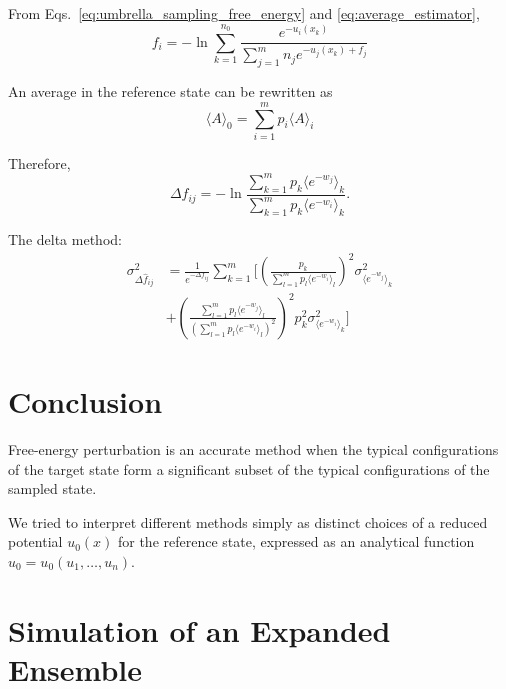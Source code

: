 \documentclass[aip,jcp,reprint,amsmath,amssymb]{revtex4-1}
\begin{document}
From Eqs.~\eqref{eq:umbrella_sampling_free_energy} and \eqref{eq:average_estimator},
\begin{equation*}
f_i = -\ln \sum_{k=1}^{n_0} \frac{e^{-u_i(x_k)}}{\sum_{j=1}^m n_j e^{-u_j(x_k) + f_j}}
\end{equation*}

An average in the reference state can be rewritten as
\begin{equation}
\label{eq:average_reference_state}
\langle A \rangle_0 = \sum_{i=1}^m p_i \langle A \rangle_i
\end{equation}

Therefore,
\begin{equation*}
\label{eq:mbar_free_energy_difference}
\Delta f_{ij} = - \ln \frac{\sum_{k=1}^m p_k \langle e^{-w_j} \rangle_k}{\sum_{k=1}^m p_k \langle e^{-w_i} \rangle_k}.
\end{equation*}

The delta method:
\begin{align*}
\sigma^2_{\Delta \hat f_{ij}} &= \frac{1}{e^{-\Delta f_{ij}}} \sum_{k=1}^m \Bigg[ \left(\frac{p_k}{\sum_{l=1}^m p_l \langle e^{-w_i} \rangle_l } \right)^2 \sigma^2_{\langle e^{-w_j} \rangle_k} \\
&+ \left( \frac{\sum_{l=1}^m p_l \langle e^{-w_j} \rangle_l}{(\sum_{l=1}^m p_l \langle e^{-w_i} \rangle_l)^2}\right)^2 p_k^2 \sigma^2_{\langle e^{-w_i} \rangle_k} \Bigg]
\end{align*}

\section{Conclusion}

Free-energy perturbation is an accurate method when the typical configurations of the target state form a significant subset of the typical configurations of the sampled state.

We tried to interpret different methods simply as distinct choices of a reduced potential $u_0(x)$ for the reference state, expressed as an analytical function $u_0 = u_0(u_1,\dots,u_n)$.

\appendix

\section{Simulation of an Expanded Ensemble}
\label{sec:expanded ensemble simulation}
\end{document}
